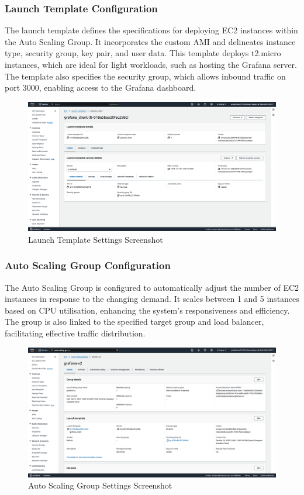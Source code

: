 \documentclass[12pt,oneside]{book} %
\begin{document}
\newpage
\subsubsection{Launch Template Configuration}
The launch template defines the specifications for deploying EC2 instances
within the Auto Scaling Group. It incorporates the custom AMI and delineates
instance type, security group, key pair, and user data. This template deploys
t2.micro instances, which are ideal for light workloads, such as hosting the
Grafana server. The template also specifies the security group, which allows
inbound traffic on port 3000, enabling access to the Grafana dashboard.
\begin{figure}[H]
    \centering
    \includegraphics[width=1\linewidth]{images/launch-template.png}
    \caption{Launch Template Settings Screenshot}\label{fig:launch-template-settings}
\end{figure}

\newpage
\subsubsection{Auto Scaling Group Configuration}
The Auto Scaling Group is configured to automatically adjust the number of EC2
instances in response to the changing demand. It scales between 1 and 5
instances based on CPU utilisation, enhancing the system's responsiveness and
efficiency. The group is also linked to the specified target group and load
balancer, facilitating effective traffic distribution.
\begin{figure}[H]
    \centering
    \includegraphics[width=1\linewidth]{images/auto-scaling-group.png}
    \caption{Auto Scaling Group Settings Screenshot}\label{fig:auto-scaling-group-settings}
\end{figure}
\end{document}
